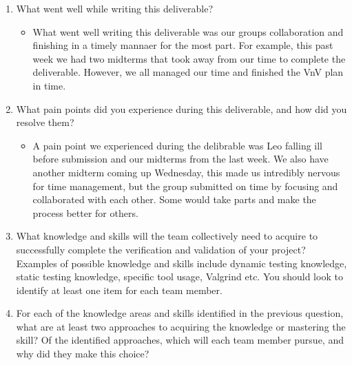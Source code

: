 \documentclass[12pt, titlepage]{article}
\begin{document}
\begin{enumerate}
  \item What went well while writing this deliverable? 
  \begin{itemize}
        \item What went well writing this deliverable was our groups collaboration and finishing in a timely mannaer for the most part.
        For example, this past week we had two midterms that took away from our time to complete the deliverable. However, we all managed our time
        and finished the VnV plan in time.
  \end{itemize}
  \item What pain points did you experience during this deliverable, and how
    did you resolve them?
  \begin{itemize}
        \item A pain point we experienced during the delibrable was Leo falling ill before submission and our midterms from the last week. We also have another midterm coming up Wednesday, this 
         made us intredibly nervous for time management, but the group submitted on time 
         by focusing and collaborated with each other. Some would take parts and make the process better for others.
  \end{itemize}
  \item What knowledge and skills will the team collectively need to acquire to
  successfully complete the verification and validation of your project?
  Examples of possible knowledge and skills include dynamic testing knowledge,
  static testing knowledge, specific tool usage, Valgrind etc.  You should look to
  identify at least one item for each team member.
  \item For each of the knowledge areas and skills identified in the previous
  question, what are at least two approaches to acquiring the knowledge or
  mastering the skill?  Of the identified approaches, which will each team
  member pursue, and why did they make this choice?
\end{enumerate}
\end{document}
